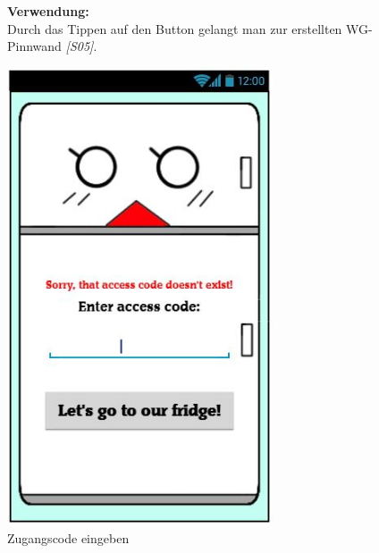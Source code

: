 \documentclass[a4paper]{scrreprt}
\begin{document}
\begin{figure}[h]
\begin{minipage}[b]{0.55\linewidth}
\begin{itemize}
    			\end{itemize}
    		
    			\hfill
    			
    			\textbf{Verwendung:}\\
    			Durch das Tippen auf den Button gelangt man
    			zur erstellten WG-Pinnwand \textit{{[}S05{]}}.
    			
    			\vspace{38mm}
    			
    		\end{minipage}
    	\end{figure}
    	
    	\begin{figure}[h!]
    		\begin{minipage}[t]{0.4\linewidth}
    			\flushright
    			\centering
    			\vspace{9mm}
    			\includegraphics[width=0.7\textwidth]{fridget_accesscodeenter.JPG}
    			\caption{Zugangscode eingeben}
    			\label{fig:figure1}
    		\end{minipage}
    		\hspace{0.5cm}

\end{figure}
\end{document}
